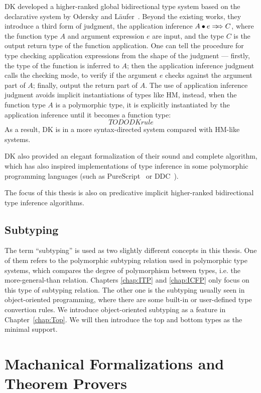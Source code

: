 DK developed a higher-ranked global bidirectional type system
based on the declarative system by Odersky and L\"aufer~\citep{odersky1996putting}.
Beyond the existing works, they introduce a third form of judgment,
the application inference $\appInf{A}{e}{C}$,
where the function type $A$ and argument expression $e$ are input,
and the type $C$ is the output return type of the function application.
One can tell the procedure for type checking application expressions
from the shape of the judgment ---
firstly, the type of the function is inferred to $A$;
then the application inference judgment calls the checking mode,
to verify if the argument $e$ checks against the argument part of $A$;
finally, output the return part of $A$.
The use of application inference judgment avoids implicit instantiations
of types like HM, instead,
when the function type $A$ is a polymorphic type,
it is explicitly instantiated by the application inference until it becomes a function type:
$$TODO DK rule$$
As a result, DK is in a more syntax-directed system compared with HM-like systems.

DK also provided an elegant formalization of their sound and complete algorithm,
which has also inspired implementations of type inference in some polymorphic 
programming languages (such as PureScript~\cite{PureScript} or DDC~\cite{Disciple}).



The focus of this thesis is also
on predicative implicit higher-ranked bidirectional type inference algorithms.


\subsection{Subtyping}

 The term ``subtyping'' is used as two slightly different concepts in this thesis.
 One of them refers to the polymorphic subtyping relation used in polymorphic type systems,
 which compares the degree of polymorphism between types, i.e. the more-general-than relation.
 Chapters \ref{chap:ITP} and \ref{chap:ICFP} only focus on this type of subtyping relation.
 The other one is the subtyping usually seen in object-oriented programming,
 where there are some built-in or user-defined type convertion rules.
 We introduce object-oriented subtyping as a feature in Chapter~\ref{chap:Top}.
 We will then introduce the top and bottom types as the minimal support.

\section{Machanical Formalizations and Theorem Provers}

